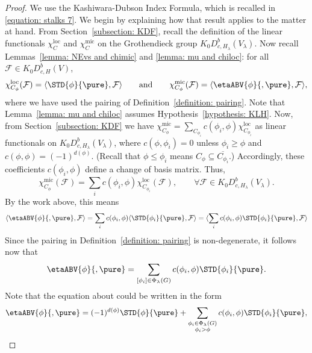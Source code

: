 \documentclass[11pt,letterpaper]{amsart}
\numberwithin{equation}{section}
\begin{document}
\begin{proof}
We use the Kashiwara-Dubson Index Formula, which is recalled in \eqref{equation: stalks 7}.
We begin by explaining how that result applies to the matter at hand. 
From Section~\ref{subsection: KDF}, recall the definition of the linear functionals $\chi^\textrm{loc}_C$ and $\chi^\textrm{mic}_C$ on the Grothendieck group $K_0 D^b_{c,H_\lambda}(V_\lambda)$.
Now recall Lemmas~\ref{lemma: NEvs and chimic} and \ref{lemma: mu and chiloc}:
for all $\mathcal{F} \in K_0 D^b_{c,H}(V)$,
\begin{equation}\label{equation: mu loc, miceta}
\chi^\textrm{loc}_{C_\phi}(\mathcal{F})
= \langle \STD{\phi}{\pure}, \mathcal{F} \rangle
\qquad\textrm{and}\qquad
\chi^\textrm{mic}_{C_\phi}(\mathcal{F})
= \langle \etaABV{\phi}{,\pure}, \mathcal{F} \rangle,
\end{equation}
 where we have used the pairing of Definition~\ref{definition: pairing}. 
 Note that Lemma~\ref{lemma: mu and chiloc} assumes Hypothesis~\ref{hypothesis: KLH}.
Now, from Section~\ref{subsection: KDF} we have 
$
\chi^\textrm{mic}_{C_\phi}
= 
\sum_{C_{\phi_i}} c(\phi_i,\phi) \chi^\textrm{loc}_{C_{\phi_i}} 
$
as linear functionals on $K_0 D^b_{c,H_\lambda}(V_\lambda)$, 
where $c(\phi,\phi_i) =0$ unless $\phi_i \geq \phi$ and $c(\phi,\phi) =(-1)^{d(\phi)}$.
(Recall that $\phi \leq \phi_i$ means $C_\phi \subseteq \overline{C_{\phi_i}}$.)
Accordingly, these coefficients $c(\phi_i,\phi)$ define a change of basis matrix.
Thus,
\[
\chi^\textrm{mic}_{C_\phi}(\mathcal{F})
= 
\sum_{i} c(\phi_i,\phi) \chi^\textrm{loc}_{C_{\phi_i}}(\mathcal{F}),
\qquad
\forall \mathcal{F} \in K_0 D^b_{c,H_\lambda}(V_\lambda).
\]
By the work above, this means
\[
{\langle \etaABV{\phi}{,\pure}, \mathcal{F} \rangle}
=
\sum_{i} c(\phi_i,\phi) 
{\langle \STD{\phi_i}{\pure}, \mathcal{F} \rangle}
=
{\langle \sum_{i} c(\phi_i,\phi) \STD{\phi_i}{\pure}, \mathcal{F} \rangle}
\]
Since the pairing in Definition~\ref{definition: pairing} is non-degenerate, it follows now that
    \begin{equation}
        \etaABV{\phi}{,\pure}
        =
    \sum_{[\phi_i]\in \Phi_{\lambda}(G)} c(\phi_i,\phi) \STD{\phi_i}{\pure}.
    \end{equation}
Note that the equation about could be written in the form
\begin{equation}
        \etaABV{\phi}{,\pure}
        =
        (-1)^{d(\phi)} \STD{\phi}{\pure} + \sum_{\substack{\phi_i\in \Phi_{\lambda}(G) \\ \phi_i>\phi}} c(\phi_i,\phi) \STD{\phi_i}{\pure},

\end{equation}
\end{proof}
\end{document}
